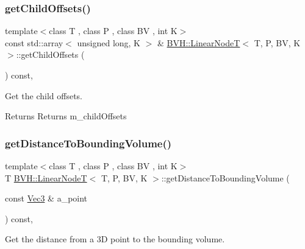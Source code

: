 \subsubsection{\texorpdfstring{get\+Child\+Offsets()}{getChildOffsets()}}
{\footnotesize\ttfamily template$<$class T , class P , class BV , int K$>$ \\
const std\+::array$<$ unsigned long, K $>$ \& \hyperlink{classBVH_1_1LinearNodeT}{B\+V\+H\+::\+Linear\+NodeT}$<$ T, P, BV, K $>$\+::get\+Child\+Offsets (\begin{DoxyParamCaption}{ }\end{DoxyParamCaption}) const\hspace{0.3cm}{\ttfamily [inline]}, {\ttfamily [noexcept]}}



Get the child offsets. 

\begin{DoxyReturn}{Returns}
Returns m\+\_\+child\+Offsets 
\end{DoxyReturn}
\mbox{\label{classBVH_1_1LinearNodeT_a2bf5b1c514a20754d527b17e1c664630}} 
\subsubsection{\texorpdfstring{get\+Distance\+To\+Bounding\+Volume()}{getDistanceToBoundingVolume()}}
{\footnotesize\ttfamily template$<$class T , class P , class BV , int K$>$ \\
T \hyperlink{classBVH_1_1LinearNodeT}{B\+V\+H\+::\+Linear\+NodeT}$<$ T, P, BV, K $>$\+::get\+Distance\+To\+Bounding\+Volume (\begin{DoxyParamCaption}\item[{const \hyperlink{classBVH_1_1LinearNodeT_a073e87d51d44b4cc243c8f90690247a6}{Vec3} \&}]{a\+\_\+point }\end{DoxyParamCaption}) const\hspace{0.3cm}{\ttfamily [inline]}, {\ttfamily [noexcept]}}



Get the distance from a 3D point to the bounding volume. 


